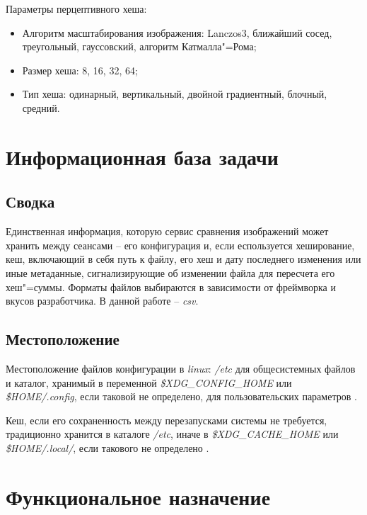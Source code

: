 \documentclass[variant=courcework]{bsuir}
\begin{document}
Параметры перцептивного хеша:

\begin{itemize}
    \item Алгоритм масштабирования изображения: Lanczos3, ближайший сосед,
          треугольный, гауссовский, алгоритм Катмалла"=Рома;
    \item Размер хеша: 8, 16, 32, 64;
    \item Тип хеша: одинарный, вертикальный, двойной градиентный, блочный,
          средний.
\end{itemize}


\section{Информационная база задачи}

\subsection{Сводка}
Единственная информация, которую сервис сравнения изображений может хранить
между сеансами -- его конфигурация и, если еспользуется хеширование, кеш,
включающий в себя путь к файлу, его хеш и дату последнего изменения или иные
метаданные, сигнализирующие об изменении файла для пересчета его хеш"=суммы.
Форматы файлов выбираются в зависимости от фреймворка и вкусов разработчика. В
данной работе -- \textit{csv}.

\subsection{Местоположение}
Местоположение файлов конфигурации в \textit{linux}: \textit{/etc} для
общесистемных файлов и каталог, хранимый в переменной
\textit{\$XDG\_CONFIG\_HOME} или \textit{\$HOME/.config}, если таковой не
определено, для пользовательских параметров \cite{xdg_base_directory_spec}.

Кеш, если его сохраненность между перезапусками системы не требуется,
традиционно хранится в каталоге \textit{/etc}, иначе в
\textit{\$XDG\_CACHE\_HOME} или \textit{\$HOME/.local/}, если такового не
определено \cite{xdg_base_directory_spec}.

\section{Функциональное назначение}
\end{document}
